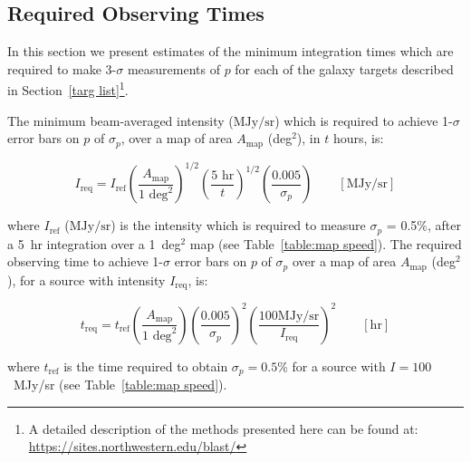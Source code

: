 
\subsection{Required Observing Times}\label{mapping speed}

In this section we present estimates of the minimum integration times which are required to make 3-$\sigma$ measurements of $p$ for each of the galaxy targets described in Section~\ref{targ list}\footnote{A detailed description of the methods presented here can be found at: \url{https://sites.northwestern.edu/blast/}}.

The minimum beam-averaged intensity ($\mathrm{MJy/sr}$) which is required to achieve 1-$\sigma$ error bars on $p$ of $\sigma_{p}$, over a map of area $A_{\mathrm{map}}$ (deg$^{2}$), in $t$ hours, is:

\begin{equation}\label{eq:Ireq}
  I_{\mathrm{req}} = I_{\mathrm{ref}} \left( \frac{A_{\mathrm{map}}}{1 \text{ deg}^{2}}  \right)^{1/2} \left( \frac{5 \text{ hr}}{t} \right)^{1/2} \left( \frac{0.005}{\sigma_{p} } \right) \qquad \left[ \mathrm{MJy/sr} \right]
\end{equation}

where $I_{\mathrm{ref}}$ ($\mathrm{MJy/sr}$) is the intensity which is required to measure $\sigma_{p}$ = 0.5\%, after a 5~hr integration over a 1~deg$^{2}$ map (see Table~\ref{table:map speed}). The required observing time to achieve 1-$\sigma$ error bars on $p$ of $\sigma_{p}$ over a map of area $A_{\mathrm{map}}$ (deg$^{2}$), for a source with intensity $I_{\mathrm{req}}$, is:

\begin{equation}\label{eq:treq}
  t_{\mathrm{req}} = t_{\mathrm{ref}} \left( \frac{A_{\mathrm{map}}}{1 \text{ deg}^{2}}  \right) \left( \frac{0.005}{\sigma_{p} } \right)^{2} \left(  \frac{100 \mathrm{ MJy/sr}}{I_{\mathrm{req}}} \right)^{2} \qquad \left[ \mathrm{hr} \right]
\end{equation}

where $t_{\mathrm{ref}}$ is the time required to obtain $\sigma_{p} = 0.5$\% for a source with $I = 100$~MJy/sr (see Table~\ref{table:map speed}).

